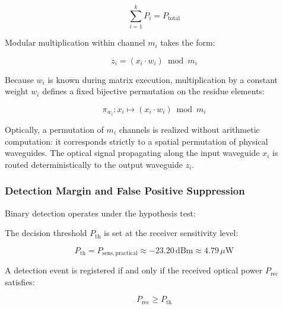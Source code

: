 \documentclass[journal]{IEEEtran}
\begin{document}
\begin{equation}
\sum_{i=1}^k P_i = P_{\mathrm{total}}
\end{equation}

Modular multiplication within channel $m_i$ takes the form:

\begin{equation}
z_i = (x_i \cdot w_i) \bmod m_i
\end{equation}

Because $w_i$ is known during matrix execution, multiplication by a constant weight $w_i$ defines a fixed bijective permutation on the residue elements:

\begin{equation}
\pi_{w_i}: x_i \mapsto (x_i \cdot w_i) \bmod m_i
\end{equation}

Optically, a permutation of $m_i$ channels is realized without arithmetic computation: it corresponds strictly to a spatial permutation of physical waveguides. The optical signal propagating along the input waveguide $x_i$ is routed deterministically to the output waveguide $z_i$.

\subsubsection{\textbf{Detection Margin and False Positive Suppression}}

Binary detection operates under the hypothesis test:

\begin{center}
\end{center}

\begin{center}
\end{center}

The decision threshold $P_{\mathrm{th}}$ is set at the receiver sensitivity level:

\begin{equation}
P_{\mathrm{th}} = P_{\mathrm{sens,practical}} \approx -23.20\,\text{dBm} \approx 4.79\,\mu\text{W}
\end{equation}

A detection event is registered if and only if the received optical power $P_{\mathrm{rec}}$ satisfies:

\begin{equation}
P_{\mathrm{rec}} \ge P_{\mathrm{th}}
\end{equation}
\end{document}
